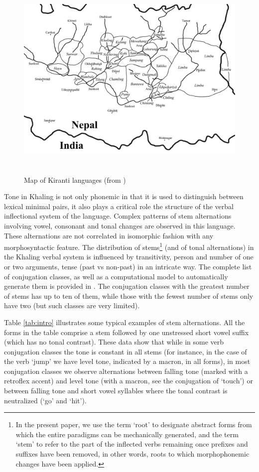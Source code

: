 \documentclass[oldfontcommands,oneside,a4paper,11pt]{article}
\begin{document}
\begin{figure}[h]
\centering
\includegraphics[height=100mm]{Kirant.jpeg}
\caption{Map of Kiranti languages (from \citealt{opgenort11tilung})}
\label{fig:kiranti}
\end{figure}


 Tone in Khaling is not only phonemic in that it is used to distinguish between lexical minimal pairs, it also plays a critical role  the structure of the verbal inflectional system of the language. Complex patterns of stem alternations involving vowel, consonant and tonal changes are observed in this language. These alternations are not correlated in isomorphic fashion with any morphosyntactic feature.  The distribution of stems\footnote{In the present paper, we use the term  `root' to designate abstract forms from which the entire paradigms can be mechanically generated, and the term `stem' to refer to the part of the inflected verbs remaining once prefixes and suffixes have been removed, in other words, roots to which morphophonemic changes have been applied.} (and of tonal alternations) in the Khaling verbal system is influenced by transitivity, person and number of one or two arguments, tense (past vs non-past) in an intricate way. The complete list of conjugation classes, as well as a computational model to automatically generate them is provided in \citet{jacques12khaling}. The conjugation classes with the greatest number of stems has up to ten of them, while those with the fewest number of stems only have two (but such classes are very limited).

Table \ref{tab:intro} illustrates some typical examples of stem alternations. All the forms in the table comprise a stem followed by one unstressed short vowel suffix (which has no tonal contrast). These data show that while in some verb conjugation classes the tone is constant in all stems (for instance, in the case of the verb `jump' we have level tone, indicated by a macron, in all forms), in most conjugation classes we observe alternations between falling tone (marked with a retroflex accent) and level tone (with a macron, see the conjugation of `touch') or between falling tone and short vowel syllables where the tonal contrast is neutralized (`go' and `hit'). 
\end{document}
